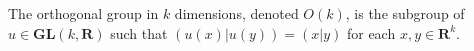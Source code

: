 The orthogonal group in $k$ dimensions, denoted $O(k)$, is the subgroup of $u \in \mathbf{GL}(k, \mathbf{R})$ such that $(u(x)|u(y)) = (x|y)$ for each $x, y \in \mathbf{R}^k$.
